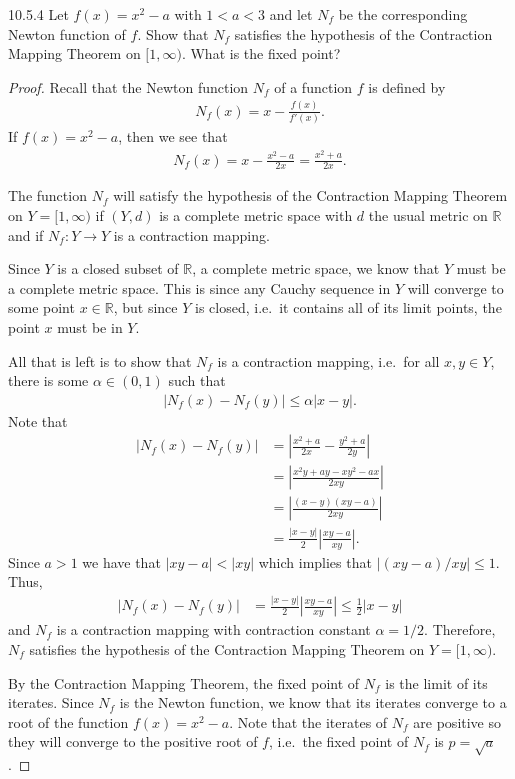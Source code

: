\begin{problem}{10.5.4}
  Let $f(x) = x^2- a$ with $1 < a < 3$ and let $N_f$ be the corresponding Newton
  function of $f$. Show that $N_f$ satisfies the hypothesis of the Contraction Mapping
  Theorem on $[1, \infty)$. What is the fixed point?
\end{problem}

\begin{proof}
  Recall that the Newton function $N_f$ of a function $f$ is defined by
  \begin{align*}
    N_f(x) = x - \frac{f(x)}{f'(x)}.
  \end{align*}
  If $f(x) = x^2- a$, then we see that
  \begin{align}\label{newton}
    N_f(x) = x - \frac{x^2-a}{2x} = \frac{x^2 + a}{2x}.
  \end{align}

  The function $N_f$ will satisfy the hypothesis of the Contraction Mapping Theorem on
  $Y = [1, \infty)$ if $(Y, d)$ is a complete metric space with $d$ the usual metric on $\mathbb{R}$
  and if $N_f: Y \to Y$ is a contraction mapping.

  Since $Y$ is a closed subset of $\mathbb{R}$, a complete metric space, we know that
  $Y$ must be a complete metric space. This is since any Cauchy sequence in $Y$ will
  converge to some point $x\in \mathbb{R}$, but since $Y$ is closed, i.e.\ it contains
  all of its limit points, the point $x$ must be in $Y$.

  All that is left is to show that $N_f$ is a contraction mapping, i.e.\ for all $x, y \in Y$,
  there is some $\alpha \in (0, 1)$ such that
  \begin{align*}
    |N_f(x) - N_f(y)| \leq \alpha |x - y|.
  \end{align*}
  Note that
  \begin{align*}
    |N_f(x) - N_f(y)| &= \left| \frac{x^2+a}{2x} - \frac{y^2+a}{2y} \right| \\
    &= \left|\frac{x^2y + ay - xy^2 - ax}{2xy}\right| \\
    &= \left|\frac{(x-y)(xy-a)}{2xy}\right| \\
    &= \frac{|x-y|}{2}\left|\frac{xy - a}{xy}\right|.
  \end{align*}
  Since $a > 1$ we have that $|xy-a| < |xy| $ which implies that $|(xy-a)/xy|\leq 1$.
  Thus,
  \begin{align*}
    |N_f(x) - N_f(y)| &= \frac{|x-y|}{2}\left|\frac{xy - a}{xy}\right| \leq \frac{1}{2}|x-y|
  \end{align*}
  and $N_f$ is a contraction mapping with contraction constant $\alpha = 1/2$. Therefore, $N_f$
  satisfies the hypothesis of the Contraction Mapping Theorem on
  $Y = [1, \infty)$.

  By the Contraction Mapping Theorem, the fixed point of $N_f$ is the limit of its iterates.
  Since $N_f$ is the Newton function, we know that its iterates converge to a root of the function $f(x) = x^2-a$.
  Note that the iterates of $N_f$ are positive so they will converge to the positive root of $f$, i.e.\
  the fixed point of $N_f$ is $p=\sqrt{a}$.
\end{proof}
\newpage

